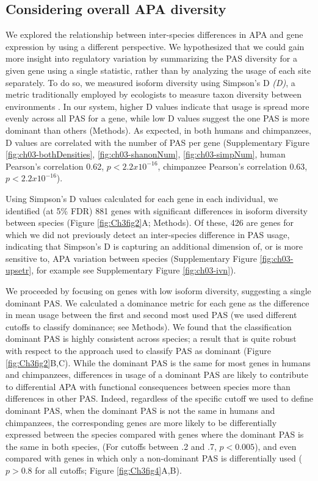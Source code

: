 \subsection{Considering overall APA diversity}\label{isodiv}


We explored the relationship between inter-species differences in APA and gene expression by using a different perspective. We hypothesized that we could gain more insight into regulatory variation by summarizing the PAS diversity for a given gene using a single statistic, rather than by analyzing the usage of each site separately. To do so, we measured isoform diversity using Simpson's D \emph{(D)}, a metric traditionally employed by ecologists to measure taxon diversity between environments \citep{morris_choosing_2014}. In our system, higher D values indicate that usage is spread more evenly across all PAS for a gene, while low D values suggest the one PAS is more dominant than others (Methods). As expected, in both humans and chimpanzees, D values are correlated with the number of PAS per gene (Supplementary Figure \ref{fig:ch03-bothDensities}, \ref{fig:ch03-shanonNum}, \ref{fig:ch03-simpNum}, human Pearson's correlation 0.62, $p<2.2x10^{-16}$, chimpanzee Pearson's correlation 0.63, $p<2.2x10^{-16}$).

Using Simpson's D values calculated for each gene in each individual, we identified (at 5\% FDR) 881 genes with significant differences in isoform diversity between species (Figure \ref{fig:Ch3fig2}A; Methods). Of these, 426 are genes for which we did not previously detect an inter-species difference in PAS usage, indicating that Simpson's D is capturing an additional dimension of, or is more sensitive to, APA variation between species (Supplementary Figure \ref{fig:ch03-upsetr}, for example see Supplementary Figure \ref{fig:ch03-ivn}).  


We proceeded by focusing on genes with low isoform diversity, suggesting a single dominant PAS. We calculated a dominance metric for each gene as the difference in mean usage between the first and second most used PAS (we used different cutoffs to classify dominance; see Methods). We found that the classification dominant PAS is highly consistent across species; a result that is quite robust with respect to the approach used to classify PAS as dominant (Figure \ref{fig:Ch3fig2}B,C). While the dominant PAS is the same for most genes in humans and chimpanzees, differences in usage of a dominant PAS are likely to contribute to differential APA with functional consequences between species more than differences in other PAS. Indeed, regardless of the specific cutoff we used to define dominant PAS, when the dominant PAS is not the same in humans and chimpanzees, the corresponding genes are more likely to be differentially expressed between the species compared with genes where the dominant PAS is the same in both species, (For cutoffs between .2 and .7, $p< 0.005$), and even compared with genes in which only a non-dominant PAS is differentially used ($p >0.8$ for all cutoffs; Figure \ref{fig:Ch3fig4}A,B).  

